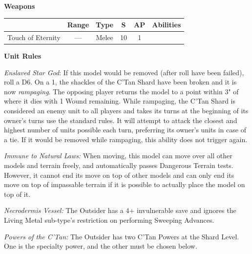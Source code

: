 \begin{minipage}[t]{0.72\textwidth}
	\vspace*{2em}
	\textbf{Weapons}
	
	\begin{tabular}{m{95 pt} *{4}{c} >{\raggedright\arraybackslash}p{130pt}}
		& Range & Type & S & AP & Abilities \\
		\hline
		Touch of Eternity & — & Melee & 10 & 1 & \quickref{Shroud of Despair} \\
	\end{tabular}
	
	\vspace*{2em}
	\textbf{Unit Rules}
	
	\textit{Enslaved Star God}: If this model would be removed (after  roll have been failed), roll a D6. On a 1, the shackles of the C'Tan Shard have been broken and it is now \textit{rampaging}. The opposing player returns the model to a point within 3" of where it dies with 1 Wound remaining. While rampaging, the C'Tan Shard is considered an enemy unit to all players and takes its turns at the beginning of its owner's turns use the standard rules. It will attempt to attack the closest and highest number of units possible each turn, preferring its owner's units in case of a tie. If it would be removed while rampaging, this ability does not trigger again.
	
	\textit{Immune to Natural Laws:} When moving, this model can move over all other models and terrain freely, and automatically passes Dangerous Terrain tests. However, it cannot end its move on top of other models and can only end its move on top of impassable terrain if it is possible to actually place the model on top of it.
	
	\textit{Necrodermis Vessel:} The Outsider has a 4+ invulnerable save and ignores the Living Metal sub-type's restriction on performing Sweeping Advances.
		
	\textit{Powers of the C'Tan:} The Outsider has two C'Tan Powers at the Shard Level. One is the  specialty power, and the other must be chosen below.
		

\end{minipage}
